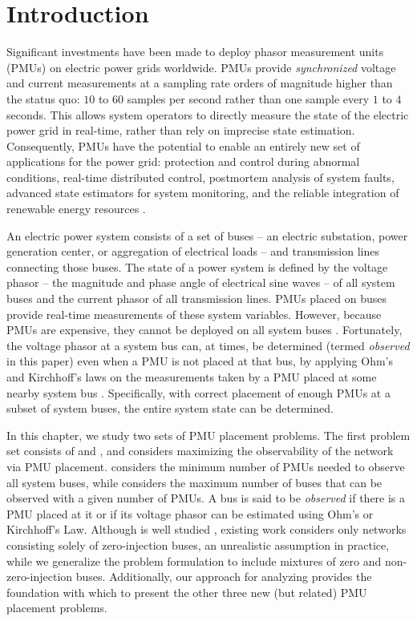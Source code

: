 \section{Introduction}
\label{sec:intro-pmu}

Significant investments have been made to deploy phasor measurement units (PMUs) on electric power grids worldwide. PMUs provide \emph{synchronized} voltage and current measurements at a sampling rate orders 
of magnitude higher than the status quo: $10$ to $60$ samples per second rather than one sample every $1$ to $4$ seconds.  This allows system operators to directly measure the state of the electric power grid in real-time, rather than 
rely on imprecise state estimation. Consequently, PMUs have the potential to enable
an entirely new set of applications for the power grid:  protection and control during abnormal conditions, real-time distributed control, postmortem analysis of system faults,
advanced state estimators for system monitoring, and the reliable integration of renewable energy resources \cite{Naspi10}.

An electric power system consists of a set of buses  -- an electric substation, power generation center, or aggregation of electrical loads -- and transmission lines connecting those buses.
The state of a power system is defined by the voltage phasor -- the magnitude and phase angle of electrical sine waves -- of all system buses and the current phasor of all transmission lines.
PMUs placed on buses provide real-time measurements of these system variables.
However, because PMUs are expensive, they cannot be deployed on all system buses \cite{Baldwin93}\cite{LaRee10}. Fortunately, the voltage phasor at a system bus can, at times, 
be determined (termed {\it observed} in this paper) even when a PMU is not placed at that bus, by applying Ohm's and Kirchhoff's laws
on the measurements taken by a PMU placed at some nearby system bus \cite{Baldwin93}\cite{Brueni05}. Specifically, with correct placement of enough PMUs at a subset of system buses, the entire system state can be determined. 

In this chapter, we study two sets of PMU placement problems.  The first problem set consists of \full and \maxincs, and considers maximizing the observability of the network via PMU placement. \full considers the minimum number of PMUs needed 
to observe all system buses, while \maxinc considers the maximum number of buses that can be observed with a given number of PMUs. 
A bus is said to be {\em observed} if there is a PMU placed at it or if
its voltage phasor can be estimated using Ohm's or Kirchhoff's Law.  Although \full is well studied \cite{Baldwin93,Brueni05,Haynes02,Mili90,Xu04}, existing work considers only networks consisting solely of zero-injection buses, 
an unrealistic assumption in practice,
while we generalize the problem formulation to include mixtures of zero and  non-zero-injection buses. Additionally, our approach for analyzing \full provides the foundation with which to present the other three new (but related) PMU placement problems.

